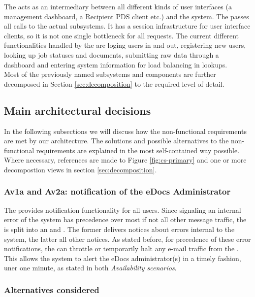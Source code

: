 The  acts as an intermediary between all different kinds of user interfaces (a management dashboard, a Recipient PDS client etc.) and the system. The  passes all calls to the actual subsystems. It has a session infrastructure for user interface clients, so it is not one single bottleneck for all requests. The current different functionalities handled by the  are loging users in and out, registering new users, looking up job statuses and documents, submitting raw data through a dashboard and entering system information for load balancing in lookups.\\
Most of the previously named subsystems and components are further decomposed in Section \ref{sec:decomposition} to the required level of detail.

\subsection{Main architectural decisions}
In the following subsections we will discuss how the non-functional requirements are met by our architecture. The solutions and possible alternatives to the non-functional requirements are explained in the most self-contained way possible. Where necessary, references are made to Figure \ref{fig:cs-primary} and one or more decompostion views in section \ref{sec:decomposition}.

\subsubsection{Av1a and Av2a: notification of the eDocs Administrator}\label{march:av1a-av2a}
The  provides notification functionality for all users. Since signaling an internal error of the system has precedence over most if not all other message traffic, the  is split into an  and . The former delivers notices about errors internal to the system, the latter all other notices. As stated before, for precedence of these error notifications, the  can throttle or temporarily halt any e-mail traffic from the . This allows the system to alert the eDocs administrator(s) in a timely fashion, uner one minute, as stated in both \emph{Availability scenarios}.

\subsubsection*{Alternatives considered}
